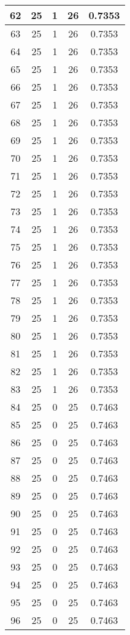 \documentclass[letterpaper, 12pt]{article}
\begin{document}
\begin{longtable}{|c|c|c|c|c|}
\hline
62 & 25 & 1 & 26 & 0.7353 \\
\hline
63 & 25 & 1 & 26 & 0.7353 \\
\hline
64 & 25 & 1 & 26 & 0.7353 \\
\hline
65 & 25 & 1 & 26 & 0.7353 \\
\hline
66 & 25 & 1 & 26 & 0.7353 \\
\hline
67 & 25 & 1 & 26 & 0.7353 \\
\hline
68 & 25 & 1 & 26 & 0.7353 \\
\hline
69 & 25 & 1 & 26 & 0.7353 \\
\hline
70 & 25 & 1 & 26 & 0.7353 \\
\hline
71 & 25 & 1 & 26 & 0.7353 \\
\hline
72 & 25 & 1 & 26 & 0.7353 \\
\hline
73 & 25 & 1 & 26 & 0.7353 \\
\hline
74 & 25 & 1 & 26 & 0.7353 \\
\hline
75 & 25 & 1 & 26 & 0.7353 \\
\hline
76 & 25 & 1 & 26 & 0.7353 \\
\hline
77 & 25 & 1 & 26 & 0.7353 \\
\hline
78 & 25 & 1 & 26 & 0.7353 \\
\hline
79 & 25 & 1 & 26 & 0.7353 \\
\hline
80 & 25 & 1 & 26 & 0.7353 \\
\hline
81 & 25 & 1 & 26 & 0.7353 \\
\hline
82 & 25 & 1 & 26 & 0.7353 \\
\hline
83 & 25 & 1 & 26 & 0.7353 \\
\hline
84 & 25 & 0 & 25 & 0.7463 \\
\hline
85 & 25 & 0 & 25 & 0.7463 \\
\hline
86 & 25 & 0 & 25 & 0.7463 \\
\hline
87 & 25 & 0 & 25 & 0.7463 \\
\hline
88 & 25 & 0 & 25 & 0.7463 \\
\hline
89 & 25 & 0 & 25 & 0.7463 \\
\hline
90 & 25 & 0 & 25 & 0.7463 \\
\hline
91 & 25 & 0 & 25 & 0.7463 \\
\hline
92 & 25 & 0 & 25 & 0.7463 \\
\hline
93 & 25 & 0 & 25 & 0.7463 \\
\hline
94 & 25 & 0 & 25 & 0.7463 \\
\hline
95 & 25 & 0 & 25 & 0.7463 \\
\hline
96 & 25 & 0 & 25 & 0.7463 \\

\end{longtable}
\end{document}
